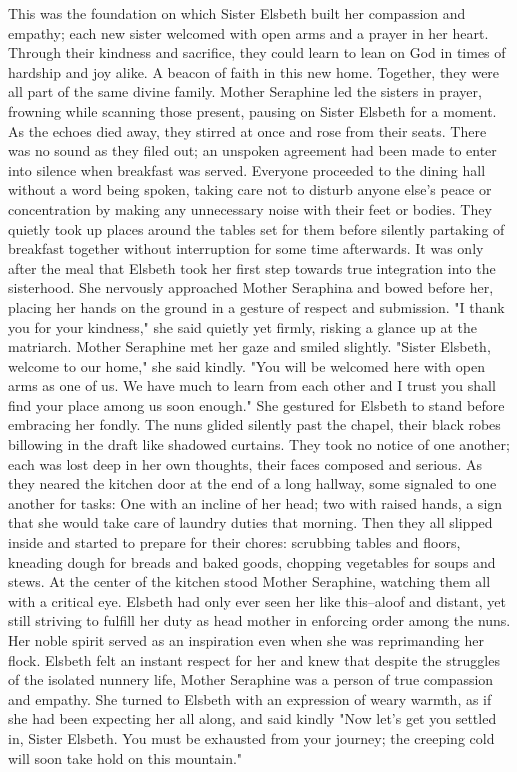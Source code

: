\documentclass[11pt]{article}
\begin{document}
This was the foundation on which Sister Elsbeth built her compassion and empathy; each new sister welcomed with open arms and a prayer in her heart. Through their kindness and sacrifice, they could learn to lean on God in times of hardship and joy alike. A beacon of faith in this new home. Together, they were all part of the same divine family.
Mother Seraphine led the sisters in prayer, frowning while scanning those present, pausing on Sister Elsbeth for a moment. As the echoes died away, they stirred at once and rose from their seats. There was no sound as they filed out; an unspoken agreement had been made to enter into silence when breakfast was served. Everyone proceeded to the dining hall without a word being spoken, taking care not to disturb anyone else's peace or concentration by making any unnecessary noise with their feet or bodies. They quietly took up places around the tables set for them before silently partaking of breakfast together without interruption for some time afterwards.
It was only after the meal that Elsbeth took her first step towards true integration into the sisterhood. She nervously approached Mother Seraphina and bowed before her, placing her hands on the ground in a gesture of respect and submission. "I thank you for your kindness," she said quietly yet firmly, risking a glance up at the matriarch.
Mother Seraphine met her gaze and smiled slightly. "Sister Elsbeth, welcome to our home," she said kindly. "You will be welcomed here with open arms as one of us. We have much to learn from each other and I trust you shall find your place among us soon enough." She gestured for Elsbeth to stand before embracing her fondly.
The nuns glided silently past the chapel, their black robes billowing in the draft like shadowed curtains. They took no notice of one another; each was lost deep in her own thoughts, their faces composed and serious. As they neared the kitchen door at the end of a long hallway, some signaled to one another for tasks: One with an incline of her head; two with raised hands, a sign that she would take care of laundry duties that morning. Then they all slipped inside and started to prepare for their chores: scrubbing tables and floors, kneading dough for breads and baked goods, chopping vegetables for soups and stews.
At the center of the kitchen stood Mother Seraphine, watching them all with a critical eye. Elsbeth had only ever seen her like this--aloof and distant, yet still striving to fulfill her duty as head mother in enforcing order among the nuns. Her noble spirit served as an inspiration even when she was reprimanding her flock. Elsbeth felt an instant respect for her and knew that despite the struggles of the isolated nunnery life, Mother Seraphine was a person of true compassion and empathy. She turned to Elsbeth with an expression of weary warmth, as if she had been expecting her all along, and said kindly "Now let's get you settled in, Sister Elsbeth. You must be exhausted from your journey; the creeping cold will soon take hold on this mountain."
\end{document}
